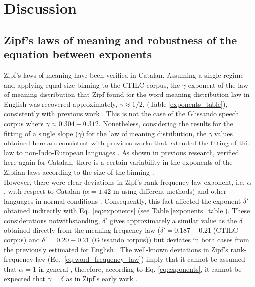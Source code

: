 \documentclass[10pt,letterpaper]{article}
\begin{document}
\section*{Discussion}
\label{S:4}

\subsection*{Zipf's laws of meaning and robustness of the equation between exponents}

Zipf’s laws of meaning have been verified in Catalan. Assuming a single regime and applying equal-size binning to the CTILC corpus, the $\gamma$ exponent of the law of meaning distribution that Zipf found for the word meaning distribution law in English \cite{Zipf1949, Zipf_MFL} was recovered approximately, $\gamma \approx 1/2$, (Table \ref{exponents_table}), consistently with previous work \cite{Ferrer2017, Ferrer2016}. This is not the case of the Glissando speech corpus  where $\gamma \approx 0.304-0.312$. Nonetheless, considering the results for the fitting of a single slope ($\gamma$) for the law of meaning distribution, the $\gamma$ values obtained here are consistent with previous works \cite{Casas2019, Ilgen2007} that extended the fitting of this law to non-Indo-European languages \cite{bond2019testing}. As shown in previous research, verified here again for Catalan, there is a certain variability in the exponents of the Zipfian laws according to the size of the binning \cite{bond2019testing, Casas2019, Ilgen2007}.\\

However, there were clear deviations in Zipf's rank-frequency law exponent, i.e. $\alpha$, with respect to Catalan ($\alpha=1.42$ in \cite{entropy2019} using different methods) and other languages in normal conditions \cite{Ferrer2005variation, Baixeries2013}.  Consequently, this fact affected the exponent $\delta'$ obtained indirectly with Eq.~\ref{eq:exponents} (see Table \ref{exponents_table}). These considerations notwithstanding, $\delta'$ gives approximately a similar value as the $\delta$ obtained directly from the meaning-frequency law ($\delta'= 0.187-0.21$ (CTILC corpus) and $\delta'= 0.20-0.21$ (Glissando corpus)) but deviates in both cases from the previously estimated for English \cite{Zipf_MFL, Ferrer2017}. The well-known deviations in Zipf's rank-frequency law (Eq.~\ref{eq:word_frequency_law}) imply that it cannot be assumed that $\alpha = 1$ in general \cite{Ferrer2005variation,Baixeries2013}, therefore, according to Eq. \ref{eq:exponents}, it cannot be expected that $\gamma = \delta$ as in Zipf's early work \cite{Zipf_MFL,bond2019testing}.\\
\end{document}
